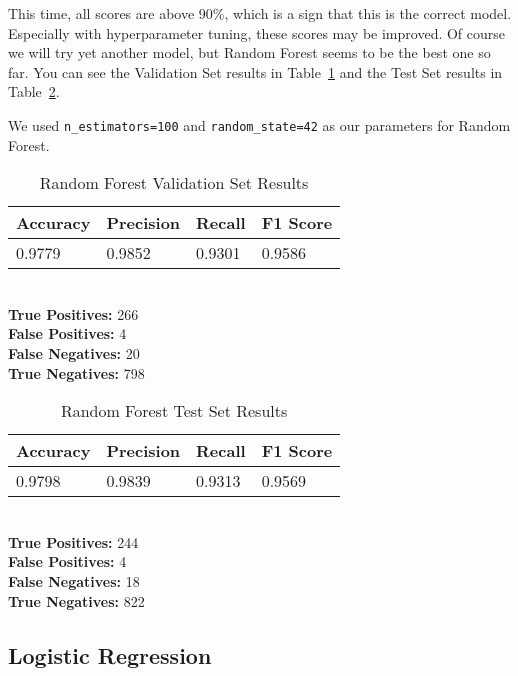 \documentclass[conference]{IEEEtran}
\begin{document}
This time, all scores are above $90\%$, which is a sign that this is the correct model. Especially with hyperparameter tuning, these scores may be improved. Of course we will try yet another model, but Random Forest seems to be the best one so far. You can see the Validation Set results in Table \ref{tab:rf1} and the Test Set results in Table \ref{tab:rf2}.

We used \verb|n_estimators=100| and \verb|random_state=42| as our parameters for Random Forest.

\begin{table}[H]
    \caption{Random Forest Validation Set Results}

    \begin{tabularx}{\linewidth}{|X|X|X|X|}
        \hline
        \textbf{Accuracy} & \textbf{Precision} & \textbf{Recall} & \textbf{F1 Score} \\
        \hline
        0.9779 & 0.9852 & 0.9301 & 0.9586 \\
        \hline
    \end{tabularx}\\

    \textbf{True Positives:} 266\\
    \textbf{False Positives:} 4\\
    \textbf{False Negatives:} 20\\
    \textbf{True Negatives:} 798
    \label{tab:rf1}
\end{table}

\begin{table}[H]
    \caption{Random Forest Test Set Results}

    \begin{tabularx}{\linewidth}{|X|X|X|X|}
        \hline
        \textbf{Accuracy} & \textbf{Precision} & \textbf{Recall} & \textbf{F1 Score} \\
        \hline
        0.9798 & 0.9839 & 0.9313 & 0.9569 \\
        \hline
    \end{tabularx}\\

    \textbf{True Positives:} 244\\
    \textbf{False Positives:} 4\\
    \textbf{False Negatives:} 18\\
    \textbf{True Negatives:} 822
    \label{tab:rf2}
\end{table}

\subsection{Logistic Regression}
\end{document}
